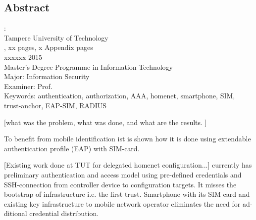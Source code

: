 \documentclass[12pt,a4paper,english]{tutthesis}
\begin{document}
\if@twoside
\clearpage
\fi


\setcounter{page}{0} %

\begin{otherlanguage}{english} %
\chapter*{Abstract}

\begin{spacing}{1.0}
  {\bf \textsf{\MakeUppercase{\@author}}}: \@title\\   %
   \textsf{Tampere University of Technology}\\
   \textsf{\@thesistype, xx pages, x Appendix pages} \\
   \textsf{xxxxxx 2015}\\
   \textsf{Master's Degree Programme in Information Technology}\\
   \textsf{Major: Information Security}\\
   \textsf{Examiner: Prof. \@examiner}\\ %
   \textsf{Keywords: authentication, authorization, AAA, homenet, smartphone, SIM, trust-anchor, EAP-SIM, RADIUS}\\
\end{spacing}

[what was the problem, what was done, and what are the results. ]

To benefit from mobile identification ist is shown how
it is done using extendable authentication profile (EAP) with SIM-card. 


[Existing work done at TUT for delegated homenet configuration...]
currently has preliminary authentication and access model using
pre-defined credentials and SSH-connection from 
controller device to configuration targets. It misses the bootstrap of 
infrastructure i.e. the first trust. 
Smartphone with its SIM card and existing key infrastructure to mobile network operator eliminates the need for additional credential distribution.



\end{otherlanguage}
\end{document}
